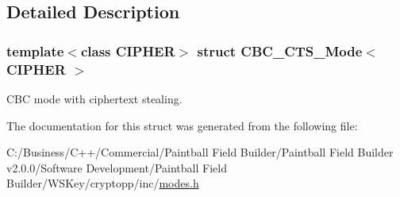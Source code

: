 \subsection{Detailed Description}
\subsubsection*{template$<$class CIPHER$>$ struct CBC\_\-CTS\_\-Mode$<$ CIPHER $>$}

CBC mode with ciphertext stealing. 

The documentation for this struct was generated from the following file:\begin{DoxyCompactItemize}
\item 
C:/Business/C++/Commercial/Paintball Field Builder/Paintball Field Builder v2.0.0/Software Development/Paintball Field Builder/WSKey/cryptopp/inc/\hyperlink{modes_8h}{modes.h}\end{DoxyCompactItemize}
